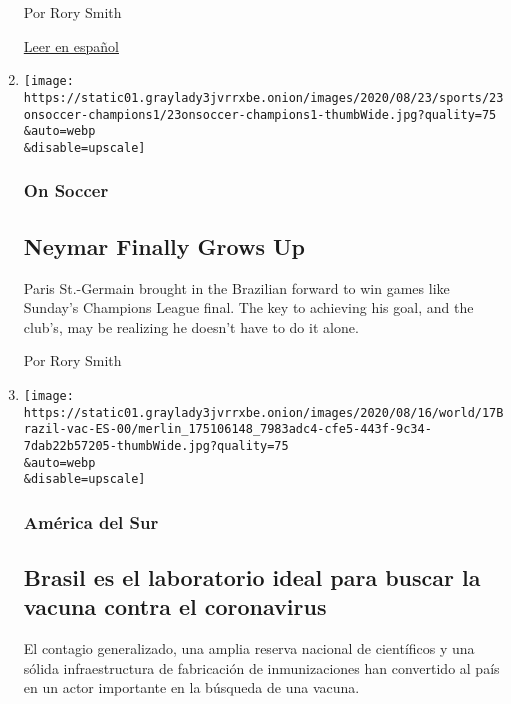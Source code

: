 \begin{enumerate}
  Por Rory Smith

  \href{https://www.nytimes3xbfgragh.onion/es/2020/08/25/espanol/deportes/messi-se-va-barcelona.html}{Leer
  en español}
\item
  \href{/2020/08/23/sports/soccer/neymar-psg-.html}{}

  \texttt{[image: https://static01.graylady3jvrrxbe.onion/images/2020/08/23/sports/23onsoccer-champions1/23onsoccer-champions1-thumbWide.jpg?quality=75\\\&auto=webp\\\&disable=upscale]}

  \hypertarget{on-soccer}{%
  \subsubsection{On Soccer}\label{on-soccer}}

  \hypertarget{neymar-finally-grows-up}{%
  \subsection{Neymar Finally Grows Up}\label{neymar-finally-grows-up}}

  Paris St.-Germain brought in the Brazilian forward to win games like
  Sunday's Champions League final. The key to achieving his goal, and
  the club's, may be realizing he doesn't have to do it alone.

  Por Rory Smith
\item
  \href{/es/2020/08/17/espanol/america-latina/vacuna-coronavirus-brasil.html}{}

  \texttt{[image: https://static01.graylady3jvrrxbe.onion/images/2020/08/16/world/17Brazil-vac-ES-00/merlin\_175106148\_7983adc4-cfe5-443f-9c34-7dab22b57205-thumbWide.jpg?quality=75\\\&auto=webp\\\&disable=upscale]}

  \hypertarget{amuxe9rica-del-sur}{%
  \subsubsection{América del Sur}\label{amuxe9rica-del-sur}}

  \hypertarget{brasil-es-el-laboratorio-ideal-para-buscar-la-vacuna-contra-el-coronavirus}{%
  \subsection{Brasil es el laboratorio ideal para buscar la vacuna
  contra el
  coronavirus}\label{brasil-es-el-laboratorio-ideal-para-buscar-la-vacuna-contra-el-coronavirus}}

  El contagio generalizado, una amplia reserva nacional de científicos y
  una sólida infraestructura de fabricación de inmunizaciones han
  convertido al país en un actor importante en la búsqueda de una
  vacuna.


\end{enumerate}
